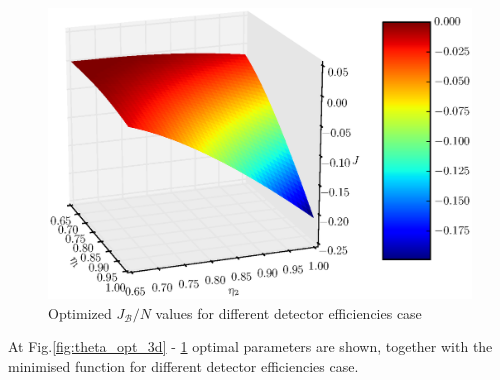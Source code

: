 \documentclass[11pt]{article}
\begin{document}
\begin{figure}[t]
\includegraphics[scale=0.7]{J3d.eps}
\caption{Optimized $J_{\mathcal{B}}/N$ values for different detector efficiencies case}
\label{fig:J_opt_3d}
\end{figure}

At Fig.\ref{fig:theta_opt_3d} - \ref{fig:J_opt_3d} optimal parameters are shown, together with 
the minimised function for different detector efficiencies case.

\begingroup
\small
\end{document}
